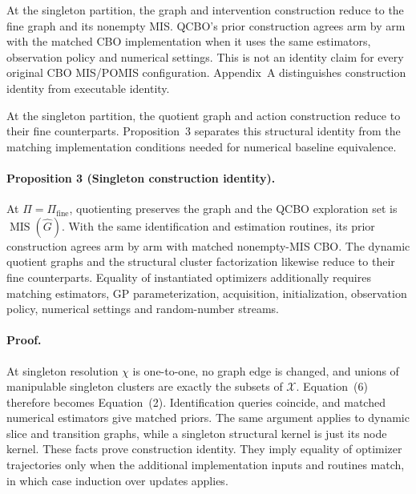 At the singleton partition, the graph and intervention construction reduce
to the fine graph and its nonempty MIS. QCBO's prior construction agrees
arm by arm with the matched CBO implementation when it uses the same
estimators, observation policy and numerical settings. This is not an
identity claim for every original CBO MIS/POMIS configuration.
Appendix~A distinguishes construction identity from executable identity.

At the singleton partition, the quotient graph and action construction
reduce to their fine counterparts. Proposition~3 separates this structural
identity from the matching implementation conditions needed for numerical
baseline equivalence.

\paragraph{Proposition 3 (Singleton construction identity).}
At $\Pi=\Pi_{\mathrm{fine}}$, quotienting preserves the graph and the QCBO
exploration set is $\operatorname{MIS}(\widehat G)$. With the same
identification and estimation routines, its prior construction agrees
arm by arm with matched nonempty-MIS CBO. The dynamic quotient graphs and
the structural cluster factorization likewise reduce to their fine
counterparts. Equality of instantiated optimizers additionally requires
matching estimators, GP parameterization, acquisition, initialization,
observation policy, numerical settings and random-number streams.

\paragraph{Proof.}
At singleton resolution $\chi$ is one-to-one, no graph edge is changed,
and unions of manipulable singleton clusters are exactly the subsets of
$\mathcal X$. Equation~(6) therefore becomes Equation~(2).
Identification queries coincide, and matched numerical estimators give
matched priors. The same argument applies to dynamic slice and transition
graphs, while a singleton structural kernel is just its node kernel.
These facts prove construction identity. They imply equality of
optimizer trajectories only when the additional implementation inputs
and routines match, in which case induction over updates applies.

